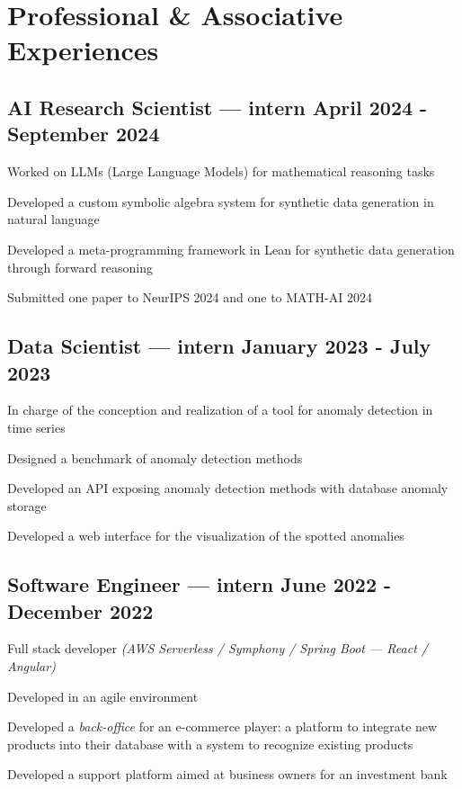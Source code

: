 \section{Professional \& Associative Experiences}
\vspace{0.1cm}

\subsection{{AI Research Scientist --- intern \hfill April 2024 - September 2024}}
\begin{zitemize}
    \item Worked on LLMs (Large Language Models) for mathematical reasoning tasks
    \item Developed a custom symbolic algebra system for synthetic data generation in natural language
    \item Developed a meta-programming framework in Lean for synthetic data generation through forward reasoning
    \item Submitted one paper to NeurIPS 2024 and one to MATH-AI 2024
\end{zitemize}
\vspace{0.1cm}

\subsection{{Data Scientist --- intern \hfill January 2023 - July 2023}}
\begin{zitemize}
    \item In charge of the conception and realization of a tool for anomaly detection in time series
    \item Designed a benchmark of anomaly detection methods
    \item Developed an API exposing anomaly detection methods with database anomaly storage
    \item Developed a web interface for the visualization of the spotted anomalies
\end{zitemize}
\vspace{0.1cm}

\subsection{{Software Engineer --- intern \hfill June 2022 - December 2022}}
\begin{zitemize}
    \item Full stack developer \textit{(AWS Serverless / Symphony / Spring Boot --- React / Angular)}
    \item Developed in an agile environment
    \item Developed a \textit{back-office} for an e-commerce player: a platform to integrate new products into their database with a system to recognize existing products
    \item Developed a support platform aimed at business owners for an investment bank
\end{zitemize}
\vspace{0.1cm}

